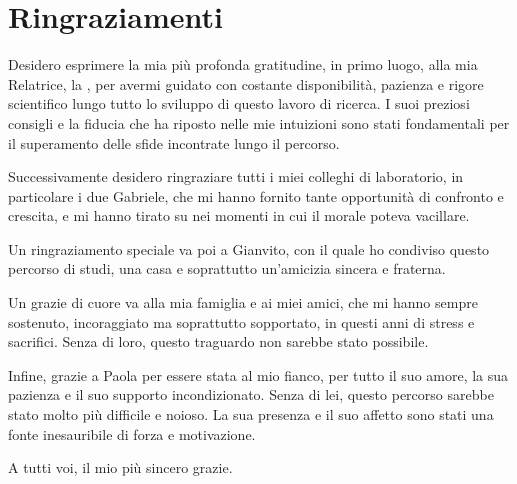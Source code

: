 \chapter*{Ringraziamenti}

Desidero esprimere la mia più profonda gratitudine, in primo luogo, alla mia Relatrice, la \relatore, per avermi guidato con costante disponibilità, pazienza e rigore scientifico lungo tutto lo sviluppo di questo lavoro di ricerca. I suoi preziosi consigli e la fiducia che ha riposto nelle mie intuizioni sono stati fondamentali per il superamento delle sfide incontrate lungo il percorso. \par
Successivamente desidero ringraziare tutti i miei colleghi di laboratorio, in particolare i due Gabriele, che mi hanno fornito tante opportunità di confronto e crescita, e mi hanno tirato su nei momenti in cui il morale poteva vacillare. \par 
Un ringraziamento speciale va poi a Gianvito, con il quale ho condiviso questo percorso di studi, una casa e soprattutto un'amicizia sincera e fraterna. \par
Un grazie di cuore va alla mia famiglia e ai miei amici, che mi hanno sempre sostenuto, incoraggiato ma soprattutto sopportato, in questi anni di stress e sacrifici. Senza di loro, questo traguardo non sarebbe stato possibile. \par
Infine, grazie a Paola per essere stata al mio fianco, per tutto il suo amore, la sua pazienza e il suo supporto incondizionato. Senza di lei, questo percorso sarebbe stato molto più difficile e noioso. La sua presenza e il suo affetto sono stati una fonte inesauribile di forza e motivazione. \par
A tutti voi, il mio più sincero grazie.
